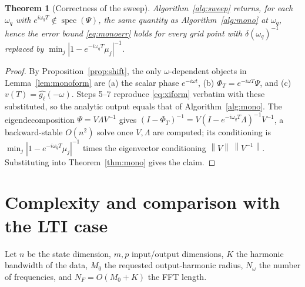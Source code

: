 \documentclass{amsart}
\newtheorem{theorem}{Theorem}
\theoremstyle{definition}
\DeclareMathOperator{\spec}{spec}
\newcommand{\norm}[1]{\left\lVert#1\right\rVert}
\begin{document}
\begin{theorem}[Correctness of the sweep]\label{thm:sweep}
Algorithm~\ref{alg:sweep} returns, for each $\omega_q$ with
$e^{i\omega_q T}\notin\spec(\Psi)$, the same quantity as
Algorithm~\ref{alg:mono} at $\omega_q$, hence the error bound \eqref{eq:monoerr}
holds for every grid point with $\delta(\omega_q)^{-1}$ replaced by
$\min_j |1-e^{-i\omega_q T}\mu_j|^{-1}$.
\end{theorem}

\begin{proof}
By Proposition~\ref{prop:shift}, the only $\omega$-dependent objects in
Lemma~\ref{lem:monoform} are (a) the scalar phase $e^{-i\omega t}$,
(b) $\Phi_T=e^{-i\omega T}\Psi$, and (c) $v(T)=\widehat{g_\ell}(-\omega)$. Steps
5--7 reproduce \eqref{eq:xiform} verbatim with these substituted, so the
analytic output equals that of Algorithm~\ref{alg:mono}. The eigendecomposition
$\Psi=V\Lambda V^{-1}$ gives
$(I-\Phi_T)^{-1}=V(I-e^{-i\omega_q T}\Lambda)^{-1}V^{-1}$, a backward-stable
$O(n^2)$ solve once $V,\Lambda$ are computed; its conditioning is
$\min_j|1-e^{-i\omega_q T}\mu_j|^{-1}$ times the eigenvector conditioning
$\norm V\,\norm{V^{-1}}$. Substituting into Theorem~\ref{thm:mono} gives the
claim.
\end{proof}

\section{Complexity and comparison with the LTI case}\label{sec:complexity}

Let $n$ be the state dimension, $m,p$ input/output dimensions, $K$ the harmonic
bandwidth of the data, $M_0$ the requested output-harmonic radius,
$N_\omega$ the number of frequencies, and $N_F=O(M_0+K)$ the FFT length.
\end{document}
